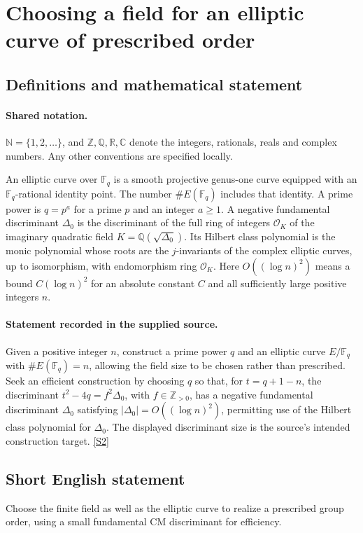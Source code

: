 \documentclass[11pt]{article}
\newcommand{\sref}[2]{\hyperlink{source:#1:#2}{[S#2]}}
\begin{document}
\section{Choosing a field for an elliptic curve of prescribed order}\label{statement}

\subsection{Definitions and mathematical statement}

\paragraph{Shared notation.}$\mathbb N=\{1,2,\ldots\}$, and $\mathbb Z,\mathbb Q,\mathbb R,\mathbb C$ denote the integers, rationals, reals and complex numbers. Any other conventions are specified locally.


An elliptic curve over $\mathbb F_q$ is a smooth projective genus-one curve equipped with an $\mathbb F_q$-rational identity point. The number $\#E(\mathbb F_q)$ includes that identity. A prime power is $q=p^a$ for a prime $p$ and an integer $a\ge1$. A negative fundamental discriminant $\Delta_0$ is the discriminant of the full ring of integers $\mathcal O_K$ of the imaginary quadratic field $K=\mathbb Q(\sqrt{\Delta_0})$. Its Hilbert class polynomial is the monic polynomial whose roots are the $j$-invariants of the complex elliptic curves, up to isomorphism, with endomorphism ring $\mathcal O_K$. Here $O((\log n)^2)$ means a bound $C(\log n)^2$ for an absolute constant $C$ and all sufficiently large positive integers $n$.
\paragraph{Statement recorded in the supplied source.}
Given a positive integer $n$, construct a prime power $q$ and an elliptic curve $E/\mathbb F_q$ with $\#E(\mathbb F_q)=n$, allowing the field size to be chosen rather than prescribed. Seek an efficient construction by choosing $q$ so that, for $t=q+1-n$, the discriminant $t^2-4q=f^2\Delta_0$, with $f\in\mathbb Z_{>0}$, has a negative fundamental discriminant $\Delta_0$ satisfying $|\Delta_0|=O((\log n)^2)$, permitting use of the Hilbert class polynomial for $\Delta_0$. The displayed discriminant size is the source's intended construction target. \sref{statement}{2}

\subsection{Short English statement}
Choose the finite field as well as the elliptic curve to realize a prescribed group order, using a small fundamental CM discriminant for efficiency.
\end{document}
